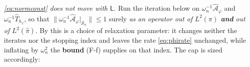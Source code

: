 \begin{definition}
\emph{\eqref{eq:normconst} does not move with $\mathsf L$.}
Run the iteration below on $\omega_n^{-1}\hat{\mathcal A}_\varphi$ and
$\omega_n^{-1}\hat T_{h_x}$, so that $\|\omega_n^{-1}\hat{\mathcal A}_\varphi\vert_{\mathcal S_n}\|\le1$
surely \emph{as an operator out of $L^{2}(\pi)$ \textbf{and} out of $L^{2}(\hat\pi)$}. By
 this is a choice of relaxation parameter: it changes neither the iterates nor
the stopping index and leaves the rate \eqref{eq:phirate} unchanged, while inflating by $\omega_n^{2}$
the \textbf{bound} \textup{(F-f)} supplies on that index. The cap is sized accordingly:

\end{definition}
